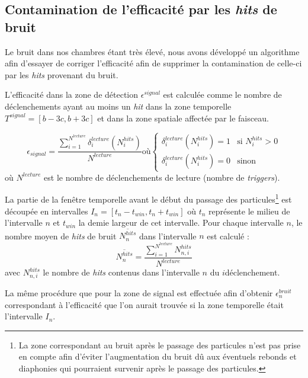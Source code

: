 \subsection{Contamination de l'efficacité par les \textit{hits} de bruit}

Le bruit dans nos chambres étant très élevé, nous avons développé un algorithme afin d'essayer de corriger l'efficacité afin de supprimer la contamination de celle-ci par les \textit{hits} provenant du bruit.

L'efficacité dans la zone de détection $\epsilon^{signal}$ est calculée comme le nombre de déclenchements ayant au moins un \textit{hit} dans la zone temporelle $T^{signal}=\left[b-3c,b+3c\right]$ et dans la zone spatiale affectée par le faisceau.

\begin{equation}
\epsilon_{signal}=\frac{\sum\limits_{i=1}^{N^{lecture}} \delta^{lecture}_i(N^{hits}_{i})}{N^{lecture}} \mbox{où}
\left\{
\begin{array}{ll}
\delta^{lecture}_i(N^{hits}_{i})=1 & \mbox{si } N^{hits}_{i}>0 \\
\delta^{lecture}_i(N^{hits}_{i})=0 & \mbox{sinon}
\end{array}
\right.
\end{equation}
où $N^{lecture}$ est le nombre de déclenchements de lecture (nombre de \textit{triggers}).

La partie de la fenêtre temporelle avant le début du passage des particules\footnote{La zone correspondant au bruit après le passage des particules n'est pas prise en compte afin d'éviter l'augmentation du bruit dû aux éventuels rebonds et diaphonies qui pourraient survenir après le passage des particules.} est découpée en intervalles $I_{n}=\left[t_{n}-t_{win},t_{n}+t_{win}\right]$ où $t_{n}$ représente le milieu de l'intervalle $n$ et $t_{win}$ la demie largeur de cet intervalle. Pour chaque intervalle $n$, le nombre moyen de \textit{hits} de bruit $\overline{N^{hits}_n}$ dans l'intervalle $n$ est calculé :
\begin{equation}
\overline{N^{hits}_n}=\frac{\sum\limits_{i=1}^{N^{lecture}} N^{hits}_{n,i}}{N^{lecture}}
\end{equation}
avec $N^{hits}_{n,i}$ le nombre de \textit{hits} contenus dans l'intervalle $n$ du $i$\ieme déclenchement.

La même procédure que pour la zone de signal est effectuée afin d'obtenir $\epsilon^{bruit}_n$ correspondant à l'efficacité que l'on aurait trouvée si la zone temporelle était l'intervalle $I_{n}$.

